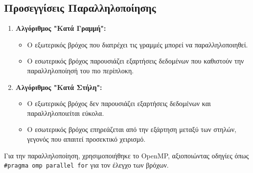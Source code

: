 \documentclass{article}
\begin{document}
\subsection*{Προσεγγίσεις Παραλληλοποίησης} 
\begin{enumerate} 
    \item \textbf{Αλγόριθμος "Κατά Γραμμή":} 
    \begin{itemize} 
        \item Ο εξωτερικός βρόχος που διατρέχει τις γραμμές μπορεί να παραλληλοποιηθεί. 
        \item Ο εσωτερικός βρόχος παρουσιάζει εξαρτήσεις δεδομένων που καθιστούν την παραλληλοποίησή του πιο περίπλοκη. 
    \end{itemize} 
    \item \textbf{Αλγόριθμος "Κατά Στήλη":} 
    \begin{itemize} 
        \item Ο εξωτερικός βρόχος δεν παρουσιάζει εξαρτήσεις δεδομένων και παραλληλοποιείται εύκολα. 
        \item Ο εσωτερικός βρόχος επηρεάζεται από την εξάρτηση μεταξύ των στηλών, γεγονός που απαιτεί προσεκτικό χειρισμό. 
    \end{itemize} 
\end{enumerate} 
Για την παραλληλοποίηση, χρησιμοποιήθηκε το OpenMP, αξιοποιώντας οδηγίες όπως \verb|#pragma omp parallel for| για τον έλεγχο των βρόχων.
\end{document}
